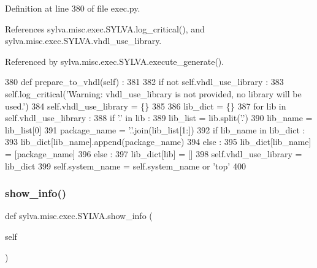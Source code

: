 Definition at line 380 of file exec.\+py.



References sylva.\+misc.\+exec.\+S\+Y\+L\+V\+A.\+log\+\_\+critical(), and sylva.\+misc.\+exec.\+S\+Y\+L\+V\+A.\+vhdl\+\_\+use\+\_\+library.



Referenced by sylva.\+misc.\+exec.\+S\+Y\+L\+V\+A.\+execute\+\_\+generate().


\begin{DoxyCode}
380   \textcolor{keyword}{def }prepare\_to\_vhdl(self) :
381 
382     \textcolor{keywordflow}{if} \textcolor{keywordflow}{not} self.vhdl\_use\_library :
383       self.log\_critical(\textcolor{stringliteral}{'Warning: vhdl\_use\_library is not provided, no library will be used.'})
384       self.vhdl\_use\_library = \{\}
385 
386     lib\_dict = \{\}
387     \textcolor{keywordflow}{for} lib \textcolor{keywordflow}{in} self.vhdl\_use\_library :
388       \textcolor{keywordflow}{if} \textcolor{stringliteral}{'.'} \textcolor{keywordflow}{in} lib :
389         lib\_list = lib.split(\textcolor{stringliteral}{'.'})
390         lib\_name = lib\_list[0]
391         package\_name = \textcolor{stringliteral}{'.'}.join(lib\_list[1:])
392         \textcolor{keywordflow}{if} lib\_name \textcolor{keywordflow}{in} lib\_dict :
393           lib\_dict[lib\_name].append(package\_name)
394         \textcolor{keywordflow}{else} :
395           lib\_dict[lib\_name] = [package\_name]
396       \textcolor{keywordflow}{else} :
397         lib\_dict[lib] = []
398     self.vhdl\_use\_library = lib\_dict
399     self.system\_name = self.system\_name \textcolor{keywordflow}{or} \textcolor{stringliteral}{'top'}
400 
\end{DoxyCode}
\mbox{\label{classsylva_1_1misc_1_1exec_1_1_s_y_l_v_a_afb708ba8dd6289db279d8a9ab09cd1b5}} 
\subsubsection{\texorpdfstring{show\+\_\+info()}{show\_info()}\hspace{0.1cm}{\footnotesize\ttfamily [1/2]}}
{\footnotesize\ttfamily def sylva.\+misc.\+exec.\+S\+Y\+L\+V\+A.\+show\+\_\+info (\begin{DoxyParamCaption}\item[{}]{self }\end{DoxyParamCaption})}



